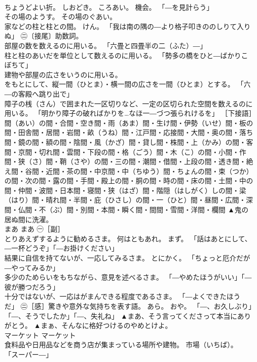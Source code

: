 \documentclass[8pt]{extreport}
\begin{document}
\begin{CJK}{UTF8}{min}
\\	ちょうどよい折。 しおどき。 ころあい。 機会。 「―を見計らう」 
\\	その場のようす。 その場のぐあい。 
\\	家などの柱と柱との間。 けん。 「我は南の隅の―より格子叩きののしりて入りぬ」 ㊁〔接尾〕助数詞。 
\\	部屋の数を数えるのに用いる。 「六畳と四畳半の二（ふた）―」 
\\	柱と柱のあいだを単位として数えるのに用いる。 「勢多の橋をひと―ばかりこぼちて」 
\\	建物や部屋の広さをいうのに用いる。 
\\	をもとにして、縦一間（ひとま）・横一間の広さを一間（ひとま）とする。 「六―の客殿へ跳り出で」 
\\	障子の桟（さん）で囲まれた一区切りなど、一定の区切られた空間を数えるのに用いる。 「明かり障子の破ればかりを…なほ一―づつ張られけるを」 ［下接語］間（あい）の間・合間・空き間・雨（あま）間・生け間・伊勢（いせ）間・板の間・田舎間・居間・岩間・畝（うね）間・江戸間・応接間・大間・奥の間・落ち間・鏡の間・額の間・陰間・風（かざ）間・貸し間・株間・上（かみ）の間・客間・京間・切れ間・雲間・下段の間・格（ごう）間・木（こ）の間・小間・作間・狭（さ）間・鞘（さや）の間・三の間・潮間・借間・上段の間・透き間・絶え間・谷間・近間・茶の間・中京間・中（ちゆう）間・ちょんの間・束（つか）の間・次の間・露の間・手間・殿上の間・胴の間・時の間・床の間・土間・中の間・仲間・波間・日本間・寝間・狭（はざ）間・階隠（はしがく）しの間・梁（はり）間・晴れ間・半間・庇（ひさし）の間・一（ひと）間・昼間・広間・深間・仏間・不（ぶ）間・別間・本間・瞬く間・間間・雪間・洋間・欄間	▲鬼の居ぬ間に洗濯。
\\	まあ	まあ	㊀［副］ 
\\	とりあえずするように勧めるさま。 何はともあれ。 まず。 「話はあとにして、―一杯どうぞ」「―お掛けください」 
\\	結果に自信を持てないが、一応してみるさま。 とにかく。 「ちょっと厄介だが―やってみるか」 
\\	多少のためらいをもちながら、意見を述べるさま。 「―やめたほうがいい」「―彼が勝つだろう」 
\\	十分ではないが、一応はがまんできる程度であるさま。 「―よくできたほうだ」 ㊁［感］驚きや意外な気持ちを表す語。 あら。 おや。 「―、お久しぶり」「―、そうでしたか」「―、失礼ね」	▲まあ、そう言ってくださって本当にありがとう。 ▲まぁ、そんなに格好つけるのやめとけよ。
\\	マーケット	マーケット	
\\	食料品や日用品などを商う店が集まっている場所や建物。 市場（いちば）。 「スーパー―」 

\end{CJK}
\end{document}

